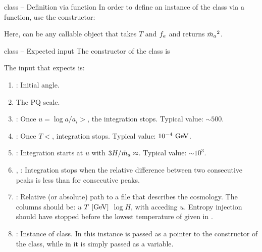 \documentclass[10pt,utf8,compress,xcolor=dvipsnames]{beamer}
\begin{document}
\begin{frame}{ class -- Definition via function}
	\fontB
	In order to define an instance of the  class via a function, use the constructor:
	\lstset{language = c++}
		

	Here,  can be any callable object that takes $T$ and $f_{a}{}$ and returns $\tilde m_{a}{}^2$.
\end{frame}





\begin{frame}{ class -- Expected input}
	\fontB
	The constructor of the  class is
		\lstset{language = c++}
		

The input that \mimes expects is:
%	
	\begin{enumerate}
		\item {}:  Initial angle. 
		\item {}  The PQ scale.
		\item {}:  Once $u=\log a/a_i>$, the integration stops. Typical value: $\sim 500$.
		\item {}:  Once $T<$, integration stops. Typical value: $10^{-4}~{\rm GeV}$.
		\item {}: Integration starts at $u$ with $3H/\tilde m_{a}{} \approx$. Typical value: $\sim 10^{3}$.
		\item {}, : Integration stops when  the relative difference 
		between two consecutive peaks  is less than  for  
		consecutive peaks.
		\item {}: Relative (or absolute) path to a file that describes the cosmology. The columns should be: $u$ $T ~[{\rm GeV}]$ $\log H$, with acceding $u$. Entropy injection should have stopped before the lowest temperature of given in .
		\item {}: Instance of  class. In \CPP this instance is passed as a pointer to the constructor
		of the  class, while in \PY it is simply passed as a variable.
	\end{enumerate}

\end{frame}
\end{document}
